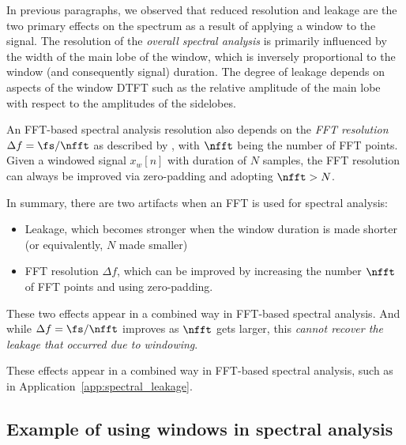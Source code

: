 In previous paragraphs, we observed that reduced resolution and leakage are the two primary effects on the spectrum as a result of applying a window to the signal. The resolution of the \emph{overall spectral analysis} is primarily influenced by the width of the main lobe of the window, which is inversely proportional to the window (and consequently signal) duration. The degree of leakage depends on aspects of the window DTFT such as the relative amplitude of the main lobe with respect to the amplitudes of the sidelobes.

An FFT-based spectral analysis resolution also depends on the \emph{FFT resolution} $\Delta f = \fs / \nfft$ as described by , with $\nfft$ being the number of FFT points. Given a windowed signal $x_w[n]$ with duration of $N$ samples, the FFT resolution can always be improved via zero-padding and adopting $\nfft > N$.

In summary, there are two artifacts when an FFT is used for spectral analysis:
\begin{itemize}
\item Leakage, which becomes stronger when the window duration is made shorter (or equivalently, $N$ made smaller)
\item FFT resolution $\Delta f$, which can be improved by increasing the number $\nfft$ of FFT points and using zero-padding.
\end{itemize}
These two effects appear in a combined way in FFT-based spectral analysis. And while $\Delta f = \fs / \nfft$ improves as $\nfft$ gets larger, this \emph{cannot recover the leakage that occurred due to windowing}.

These effects appear in a combined way in FFT-based spectral analysis, such as in
Application~\ref{app:spectral_leakage}. 



\subsection{Example of using windows in spectral analysis} 

